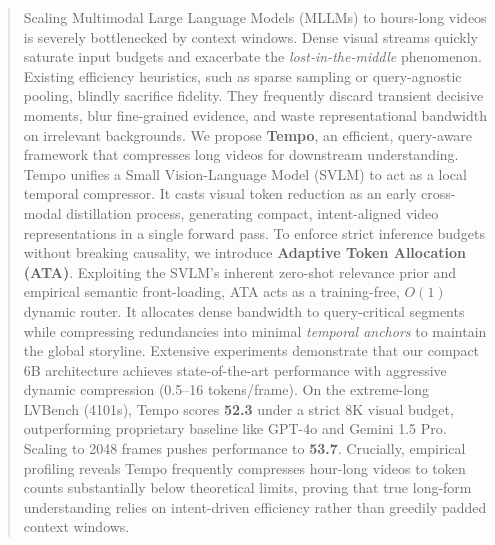\begin{abstract}  
  Scaling Multimodal Large Language Models (MLLMs) to hours-long videos is severely bottlenecked by context windows. Dense visual streams quickly saturate input budgets and exacerbate the \emph{lost-in-the-middle} phenomenon. Existing efficiency heuristics, such as sparse sampling or query-agnostic pooling, blindly sacrifice fidelity. They frequently discard transient decisive moments, blur fine-grained evidence, and waste representational bandwidth on irrelevant backgrounds.
  We propose \textbf{Tempo}, an efficient, query-aware framework that compresses long videos for downstream understanding. Tempo unifies a Small Vision-Language Model (SVLM) to act as a local temporal compressor. It casts visual token reduction as an early cross-modal distillation process, generating compact, intent-aligned video representations in a single forward pass.
  To enforce strict inference budgets without breaking causality, we introduce \textbf{Adaptive Token Allocation (ATA)}. Exploiting the SVLM's inherent zero-shot relevance prior and empirical semantic front-loading, ATA acts as a training-free, $O(1)$ dynamic router. It allocates dense bandwidth to query-critical segments while compressing redundancies into minimal \emph{temporal anchors} to maintain the global storyline.
  Extensive experiments demonstrate that our compact 6B architecture achieves state-of-the-art performance with aggressive dynamic compression (0.5--16 tokens/frame). On the extreme-long LVBench (4101s), Tempo scores \textbf{52.3} under a strict 8K visual budget, outperforming proprietary baseline like GPT-4o and Gemini 1.5 Pro. Scaling to 2048 frames pushes performance to \textbf{53.7}.
  Crucially, empirical profiling reveals Tempo frequently compresses hour-long videos to token counts substantially below theoretical limits, proving that true long-form understanding relies on intent-driven efficiency rather than greedily padded context windows.
\end{abstract}